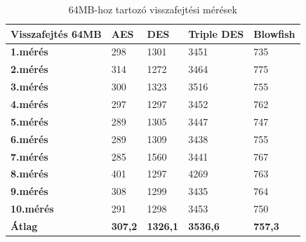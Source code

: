 \begin{table}[H]
	\centering
	\caption{64MB-hoz tartozó visszafejtési mérések}
	\label{tab:dec_64mb}
	\medskip
	\begin{tabular}{|p{2.4cm}|p{2cm}|p{2cm}|p{2cm}|p{2cm}|}
		\hline
		\textbf{Visszafejtés} \newline \textbf{64MB} & \textbf{AES} & \textbf{DES} & \textbf{Triple DES} & \textbf{Blowfish}\\
		\hline
		\textbf{1.mérés} & 298 & 1301 & 3451 & 735\\
		\hline
		\textbf{2.mérés} & 314 & 1272 & 3464 & 775\\
		\hline
		\textbf{3.mérés} & 300 & 1323 & 3516 & 755\\
		\hline
		\textbf{4.mérés} & 297 & 1297 & 3452 & 762\\
		\hline
		\textbf{5.mérés} & 289 & 1305 & 3447 & 747\\
		\hline
		\textbf{6.mérés} & 289 & 1309 & 3438 & 755\\
		\hline
		\textbf{7.mérés} & 285 & 1560 & 3441 & 767\\
		\hline
		\textbf{8.mérés} & 401 & 1297 & 4269 & 763\\
		\hline
		\textbf{9.mérés} & 308 & 1299 & 3435 & 764\\
		\hline
		\textbf{10.mérés} & 291 & 1298 & 3453 & 750\\
		\hline
		\hline
		\textbf{Átlag} & \textbf{307,2} & \textbf{1326,1} & \textbf{3536,6} & \textbf{757,3}\\
		\hline
	\end{tabular}
\end{table}


